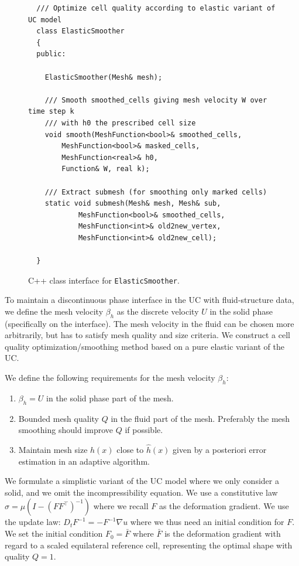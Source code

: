 \begin{figure}[!h]
\begin{lstlisting}
  /// Optimize cell quality according to elastic variant of UC model
  class ElasticSmoother
  {
  public:
    
    ElasticSmoother(Mesh& mesh);

    /// Smooth smoothed_cells giving mesh velocity W over time step k
    /// with h0 the prescribed cell size
    void smooth(MeshFunction<bool>& smoothed_cells,
		MeshFunction<bool>& masked_cells,
		MeshFunction<real>& h0,
		Function& W, real k);

    /// Extract submesh (for smoothing only marked cells)
    static void submesh(Mesh& mesh, Mesh& sub,
			MeshFunction<bool>& smoothed_cells,
			MeshFunction<int>& old2new_vertex,
			MeshFunction<int>& old2new_cell);
    
  }
\end{lstlisting}
\caption{
C++ class interface for {\tt ElasticSmoother}.
}
\label{code:ElasticSmoother}
\end{figure}

To maintain a discontinuous phase interface in the UC with
fluid-structure data, we define the mesh velocity $\beta_h$ as the
discrete velocity $U$ in the solid phase (specifically on the
interface). The mesh velocity in the fluid can be chosen more
arbitrarily, but has to satisfy mesh quality and size criteria. We
construct a cell quality optimization/smoothing method based on a pure
elastic variant of the UC.

We define the following requirements for the mesh velocity $\beta_h$:

\begin{enumerate}
\item
$\beta_h = U$ in the solid phase part of the mesh.
\item
Bounded mesh quality $Q$ in the fluid part of the mesh. Preferably the
mesh smoothing should improve $Q$ if possible.
\item
Maintain mesh size $h(x)$ close to $\hat{h}(x)$ given by a posteriori
error estimation in an adaptive algorithm.
\end{enumerate}

We formulate a simplistic variant of the UC model where we only
consider a solid, and we omit the incompressibility equation. We use a
constitutive law $\sigma = \mu(I - (FF^\top)^{-1})$ where we recall $F$
as the deformation gradient. We use the update law: $D_t F^{-1} =
-F^{-1} \nabla u$ where we thus need an initial condition for $F$. We
set the initial condition $F_0 = \bar{F}$ where $\bar{F}$ is the
deformation gradient with regard to a scaled equilateral reference
cell, representing the optimal shape with quality $Q = 1$.

